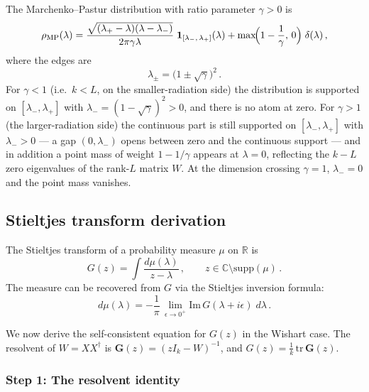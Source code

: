 \documentclass[11pt,letterpaper]{article}
\theoremstyle{plain}
\theoremstyle{definition}
\theoremstyle{remark}
\begin{document}
The Marchenko--Pastur distribution with ratio parameter $\gamma > 0$ is
\begin{equation}
  \rho_{\mathrm{MP}}(\lambda)
  = \frac{\sqrt{(\lambda_{+} - \lambda)(\lambda - \lambda_{-})}}
  {2\pi\gamma\lambda}\;
  \mathbf{1}_{[\lambda_{-},\,\lambda_{+}]}(\lambda)
  + \max\!\Bigl(1 - \frac{1}{\gamma},\, 0\Bigr)\;\delta(\lambda)\,,
  \label{eq16:mp_law}
\end{equation}
where the edges are
\begin{equation}
  \lambda_{\pm} = \bigl(1 \pm \sqrt{\gamma}\bigr)^{2}\,.
  \label{eq16:mp_edges}
\end{equation}
For $\gamma < 1$ (i.e.\ $k < L$, on the smaller-radiation side) the distribution is
supported on $[\lambda_{-}, \lambda_{+}]$ with
$\lambda_{-} = (1 - \sqrt{\gamma})^2 > 0$, and there is no atom at zero.
For $\gamma > 1$ (the larger-radiation side) the continuous part is still supported
on $[\lambda_{-}, \lambda_{+}]$ with $\lambda_{-} > 0$ --- a gap
$(0, \lambda_{-})$ opens between zero and the continuous support --- and in
addition a point mass of weight $1 - 1/\gamma$ appears at $\lambda = 0$,
reflecting the $k - L$ zero eigenvalues of the rank-$L$ matrix $W$.  At the
dimension crossing $\gamma = 1$, $\lambda_{-} = 0$ and the point mass vanishes.

\subsection{Stieltjes transform derivation}
\label{app:stieltjes_derivation}

The Stieltjes transform of a probability measure $\mu$ on $\mathbb{R}$ is
\begin{equation}
  G(z) = \int \frac{d\mu(\lambda)}{z - \lambda}\,,
  \qquad z \in \mathbb{C} \setminus \mathrm{supp}(\mu)\,.
  \label{eq16:stieltjes_def}
\end{equation}
The measure can be recovered from $G$ via the Stieltjes inversion formula:
\begin{equation}
  d\mu(\lambda) = -\frac{1}{\pi}\,
  \lim_{\epsilon \to 0^{+}} \mathrm{Im}\, G(\lambda + i\epsilon)\; d\lambda\,.
  \label{eq16:stieltjes_inversion}
\end{equation}

We now derive the self-consistent equation for $G(z)$ in the Wishart case.
The resolvent of $W = XX^{\dagger}$ is
$\mathbf{G}(z) = (zI_k - W)^{-1}$, and $G(z) = \frac{1}{k}\,
\mathrm{tr}\,\mathbf{G}(z)$.

\subsubsection{Step 1: The resolvent identity}
\end{document}
